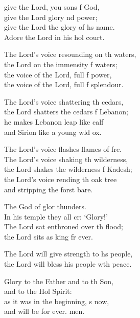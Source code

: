 \begin{psalmverse}
  \begin{patverse}
     give the Lord, you sons f God,\Med\\
    give the Lord glory nd power;\\
give the Lord the glory of h\pointup{\i}s name.\Med\\
    Adore the Lord in his hol court.

The Lord’s voice resounding on th waters,\Med\\
    the Lord on the immensity f waters;\\
the voice of the Lord, full f power,\Med\\
    the voice of the Lord, full f splendour.

The Lord’s voice shattering th cedars,\Med\\
    the Lord shatters the cedars f Lebanon;\\
he makes Lebanon leap like  calf\Med\\
    and Sirion like a young w\pointup{\i}ld ox.

The Lord’s voice flashes flames of f\pointup{\i}re.\Flex\\
    The Lord’s voice shaking th wilderness,\Med\\
    the Lord shakes the wilderness f Kadesh;\\
the Lord’s voice rending th oak tree\Med\\
    and stripping the forst bare.

The God of glor thunders.\Med\\
    In his temple they all cr: ‘Glory!’\\
The Lord sat enthroned over th flood;\Med\\
    the Lord sits as king fr ever.

The Lord will give strength to h\pointup{\i}s people,\Med\\
    the Lord will bless his people w\pointup{\i}th peace.

Glory to the Father and to th Son,\Med\\
    and to the Hol Spirit:\\
as it was in the beginning, \pointup{\i}s now,\Med\\
    and will be for ever. men.
  \end{patverse}
\end{psalmverse}
